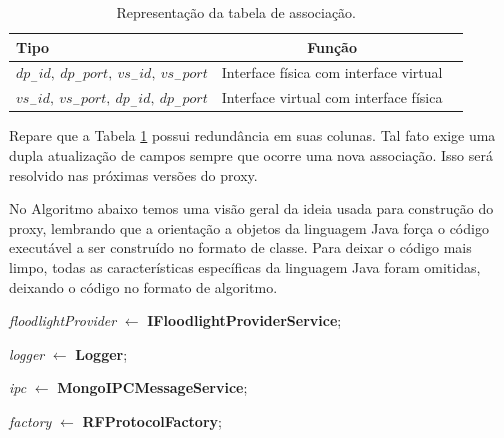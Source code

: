 \begin{itemize}
\begin{table}[h]
\centering
\begin{tabular}{|l|c|c|}
\hline
Tipo & Função\\
\hline
\hline
$dp_-id,\ dp_-port,\ vs_-id,\ vs_-port$ & Interface física com interface virtual\\
\hline
$vs_-id,\ vs_-port,\ dp_-id,\ dp_-port$ & Interface virtual com interface física\\
\hline
\end{tabular}
\caption{Representação da tabela de associação.}
\label{tab:tabela_associacao}
\end{table}

Repare que a Tabela \ref{tab:tabela_associacao} possui redundância
em suas colunas. Tal fato exige uma dupla atualização de campos
sempre que ocorre uma nova associação. Isso será resolvido
nas próximas versões do proxy.

\end{itemize} 

No Algoritmo abaixo temos uma visão geral da ideia usada para
construção do proxy, lembrando que a orientação a objetos
da linguagem Java força o código executável a ser construído
no formato de classe. Para deixar o código mais limpo, todas
as características específicas da linguagem Java foram omitidas,
deixando o código no formato de algoritmo.
\newline

\noindent
{}
\newline

\noindent
{}
\newline
\textit{floodlightProvider} $\leftarrow$ \textbf{IFloodlightProviderService};
\newline

\noindent
{}
\newline
\textit{logger} $\leftarrow$ \textbf{Logger};
\newline

\noindent
{}
\newline
\textit{ipc} $\leftarrow$ \textbf{MongoIPCMessageService};
\newline

\noindent
{}
\newline
\textit{factory} $\leftarrow$ \textbf{RFProtocolFactory};
\newline


